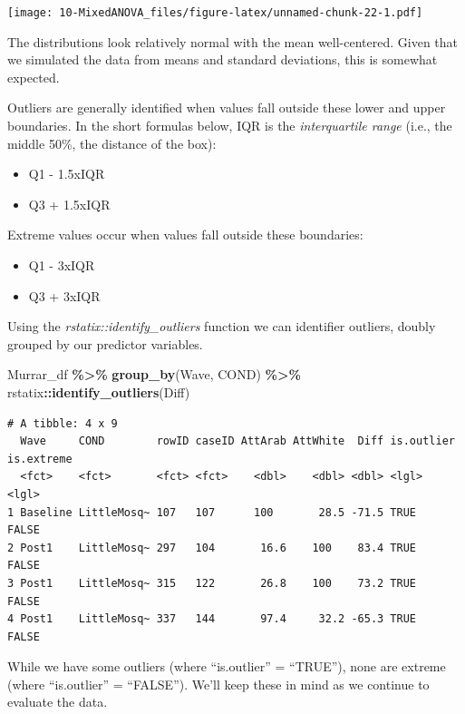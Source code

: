 \documentclass[
  11pt,
]{book}
\newenvironment{Shaded}{\begin{snugshade}}{\end{snugshade}}
\newcommand{\FunctionTok}[1]{\textcolor[rgb]{0.27,0.27,0.27}{\textbf{#1}}}
\newcommand{\NormalTok}[1]{#1}
\newcommand{\SpecialCharTok}[1]{\textcolor[rgb]{0.43,0.43,0.43}{\textbf{#1}}}
\providecommand{\tightlist}{%
  \setlength{\itemsep}{0pt}\setlength{\parskip}{0pt}}
\begin{document}
\texttt{[image: 10-MixedANOVA\_files/figure-latex/unnamed-chunk-22-1.pdf]}

The distributions look relatively normal with the mean well-centered. Given that we simulated the data from means and standard deviations, this is somewhat expected.

Outliers are generally identified when values fall outside these lower and upper boundaries. In the short formulas below, IQR is the \emph{interquartile range} (i.e., the middle 50\%, the distance of the box):

\begin{itemize}
\tightlist
\item
  Q1 - 1.5xIQR
\item
  Q3 + 1.5xIQR
\end{itemize}

Extreme values occur when values fall outside these boundaries:

\begin{itemize}
\tightlist
\item
  Q1 - 3xIQR
\item
  Q3 + 3xIQR
\end{itemize}

Using the \emph{rstatix::identify\_outliers} function we can identifier outliers, doubly grouped by our predictor variables.

\begin{Shaded}
\begin{Highlighting}[]
\NormalTok{Murrar\_df }\SpecialCharTok{\%\textgreater{}\%}
    \FunctionTok{group\_by}\NormalTok{(Wave, COND) }\SpecialCharTok{\%\textgreater{}\%}
\NormalTok{    rstatix}\SpecialCharTok{::}\FunctionTok{identify\_outliers}\NormalTok{(Diff)}
\end{Highlighting}
\end{Shaded}

\begin{verbatim}
# A tibble: 4 x 9
  Wave     COND        rowID caseID AttArab AttWhite  Diff is.outlier is.extreme
  <fct>    <fct>       <fct> <fct>    <dbl>    <dbl> <dbl> <lgl>      <lgl>     
1 Baseline LittleMosq~ 107   107      100       28.5 -71.5 TRUE       FALSE     
2 Post1    LittleMosq~ 297   104       16.6    100    83.4 TRUE       FALSE     
3 Post1    LittleMosq~ 315   122       26.8    100    73.2 TRUE       FALSE     
4 Post1    LittleMosq~ 337   144       97.4     32.2 -65.3 TRUE       FALSE     
\end{verbatim}

While we have some outliers (where ``is.outlier'' = ``TRUE''), none are extreme (where ``is.outlier'' = ``FALSE''). We'll keep these in mind as we continue to evaluate the data.
\end{document}
